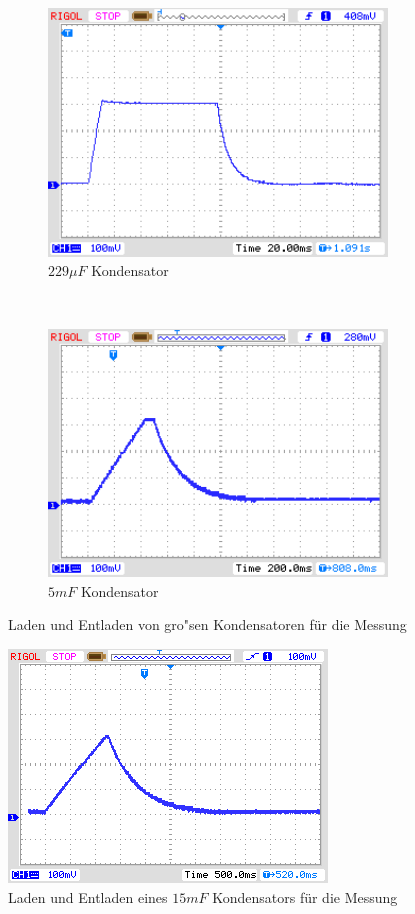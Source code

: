 \begin{figure}[H]
  \begin{subfigure}[b]{9cm}
    \centering
    \includegraphics[width=9cm]{../PNG/charge_229uF.png}
    \caption{\(229\mu F\) Kondensator}
    \label{pic:c229}
  \end{subfigure}
  ~
  \begin{subfigure}[b]{9cm}
    \centering
    \includegraphics[width=9cm]{../PNG/charge_5mF.png}
    \caption{\(5mF\) Kondensator}
    \label{pic:c5mF}
  \end{subfigure}
  \caption{Laden und Entladen von gro"sen Kondensatoren f\"ur die Messung}
\end{figure}

\begin{figure}[H]
  \centering
    \includegraphics[]{../PNG/charge_15mF.png}
  \caption{Laden und Entladen eines \(15mF\) Kondensators f\"ur die Messung}
  \label{pic:c15mF}
\end{figure}

